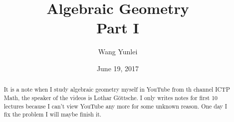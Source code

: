 \documentclass{amsart}
\theoremstyle{plain}
\theoremstyle{definition}
\theoremstyle{remark}
\numberwithin{equation}{section}
\begin{document}
\title[Complete-simple distributive lattices]
{Algebraic Geometry \\
	Part I}
\author{Wang Yunlei}
\date{June 19, 2017}
\begin{abstract}
It is a note when I study algebraic geometry myself in YouTube from th channel ICTP Math, the speaker of the videos is  Lothar G\"{o}ttsche. I only writes notes for first 10 lectures because I can't view YouTube any more for some unknown reason. One day I fix the problem I will maybe  finish it. 
\end{abstract}
\maketitle
\tableofcontents
\end{document}
